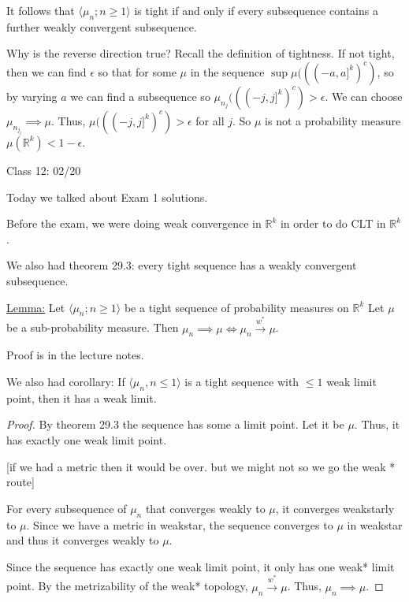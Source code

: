 \documentclass{article}
\theoremstyle{definition}
\begin{document}
It follows that \(\langle \mu_n ; n \geq 1 \rangle \) is tight if and only if every subsequence contains a further weakly convergent subsequence.

Why is the reverse direction true? Recall the definition of tightness. If not tight, then we can find \(\epsilon\) so that for some \(\mu\) in the sequence \(\sup\mu (((-a,a]^k)^c)\), so by varying \(a\) we can find a subsequence so \(\mu_{n_j} (((-j,j]^k)^c) > \epsilon\). We can choose \(\mu_{n_{j_l}} \implies \mu\). Thus, \(\mu(((-j,j]^k)^c) > \epsilon\) for all \(j\). So \(\mu\) is not a probability measure \(\mu(\mathbb{R}^k) < 1-\epsilon\).

\hrulefill

Class 12: 02/20

Today we talked about Exam 1 solutions.

Before the exam, we were doing weak convergence in \(\mathbb{R}^k\) in order to do CLT in \(\mathbb{R}^k\).

We also had theorem 29.3: every tight sequence has a weakly convergent subsequence.

\underline{Lemma:} Let \(\langle \mu_n ; n\geq 1 \rangle \) be a tight sequence of probability measures on \(\mathbb{R}^k\) Let \(\mu\) be a sub-probability measure. Then \(\mu_n \implies \mu \iff \mu_n \overset{w^{\ast}}{\to} \mu\).

Proof is in the lecture notes.

We also had corollary: If \(\langle \mu_n, n \leq 1 \rangle \) is a tight sequence with \(\leq 1\) weak limit point, then it has a weak limit.

\begin{proof}

    By theorem 29.3 the sequence has some a limit point. Let it be \(\mu\). Thus, it has exactly one weak limit point.

    [if we had a metric then it would be over. but we might not so we go the weak * route]

    For every subsequence of \(\mu_n\) that converges weakly to \(\mu\), it converges weakstarly to \(\mu\). Since we have a metric in weakstar, the sequence converges to \(\mu\) in weakstar and thus it converges weakly to \(\mu\).

    Since the sequence has exactly one weak limit point, it only has one weak* limit point. By the metrizability of the weak* topology, \(\mu_n \overset{w^{\ast}}{\to} \mu\). Thus, \(\mu_n \implies \mu\).

\end{proof}
\end{document}
